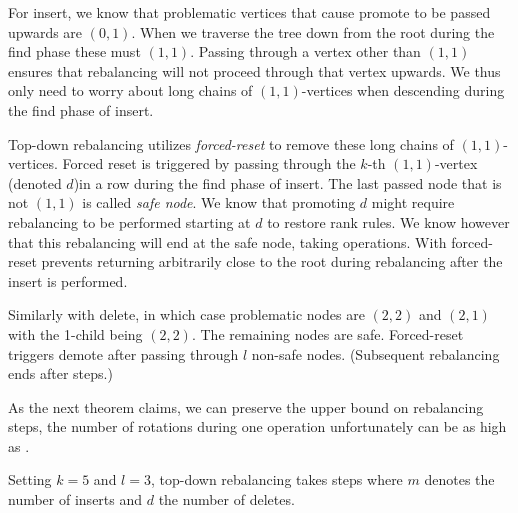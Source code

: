 For insert, we know that problematic vertices that cause promote to be passed upwards are $(0,1)$. When we traverse the tree down from the root during the find phase these must $(1,1)$. Passing through a vertex other than $(1,1)$ ensures that rebalancing will not proceed through that vertex upwards. We thus only need to worry about long chains of $(1,1)$-vertices when descending during the find phase of insert.

Top-down rebalancing utilizes \textit{forced-reset} to remove these long chains of $(1,1)$-vertices. Forced reset is triggered by passing through the $k$-th $(1,1)$-vertex (denoted $d$)in a row during the find phase of insert. The last passed node that is not $(1,1)$ is called \textit{safe node}. We know that promoting $d$ might require rebalancing to be performed starting at $d$ to restore rank rules. We know however that this rebalancing will end at the safe node, taking  operations.
With forced-reset prevents returning arbitrarily close to the root during rebalancing after the insert is performed.

Similarly with delete, in which case problematic nodes are $(2,2)$ and $(2,1)$ with the 1-child being $(2,2)$. The remaining nodes are safe. Forced-reset triggers demote after passing through $l$ non-safe nodes. (Subsequent rebalancing ends after  steps.)

As the next theorem claims, we can preserve the upper bound on rebalancing steps, the number of rotations during one operation unfortunately can be as high as .

\begin{thm}
Setting $k=5$ and $l=3$, top-down rebalancing takes  steps where $m$ denotes the number of inserts and $d$ the number of deletes.
\end{thm}